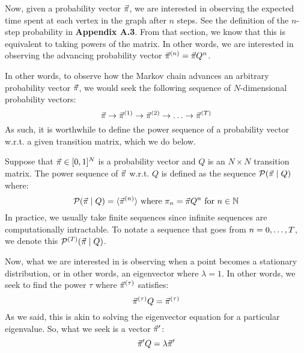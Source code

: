 Now, given a probability vector $\vec{\pi}$, we are interested in observing the expected time spent at each vertex in the graph after $n$ steps.
See the definition of the $n$-step probability in \textbf{Appendix A.3}. From that section, we know that this is equivalent to taking powers of the matrix.
In other words, we are interested in observing the advancing probability vector $\vec{\pi}^{(n)} = \vec{\pi} Q^n$.

In other words, to observe how the Markov chain advances an arbitrary probability vector $\vec{\pi}$, we would seek the following sequence of $N$-dimensional probability vectors:
$$\pivec \ra \pivecn{1} \ra \pivec^{(2)} \ra \dots \ra \pivec^{(\maxtime)}$$
As such, it is worthwhile to define the power sequence of a probability vector w.r.t. a given transition matrix, which we do below.

\begin{definition}
Suppose that $\vec{\pi} \in [0,1]^N$ is a probability vector and $Q$ is an $N \times N$ transition matrix.
The power sequence of $\vec{\pi}$ w.r.t. $Q$ is defined as the sequence $\mathcal{P}(\vec{\pi} \mid Q)$ where:
$$\mathcal{P}(\vec{\pi} \mid Q) = \langle \vec{\pi}^{(n)} \rangle \text{ where } \pi_n = \vec{\pi} Q^n \text{ for } {n \in \mathbb{N}}$$
In practice, we usually take finite sequences since infinite sequences are computationally intractable.
To notate a sequence that goes from $n = 0, \dots, T$, we denote this $\mathcal{P}^{(T)}(\vec{\pi} \mid Q)$.
\end{definition}



%
%
%
%
%
%
%
%
%


\newpage

Now, what we are interested in is observing when a point becomes a stationary distribution, or in other words, an eigenvector where $\lambda = 1$.
In other words, we seek to find the power $\tau$ where $\vec{\pi}^{(\tau)}$ satisfies:
$$ \vec{\pi}^{(\tau)}Q = \vec{\pi}^{(\tau)} $$
As we said, this is akin to solving the eigenvector equation for a particular eigenvalue. So, what we seek is a vector $\vec{\pi}'$:
$$ \vec{\pi}'Q = \lambda \vec{\pi}' $$


